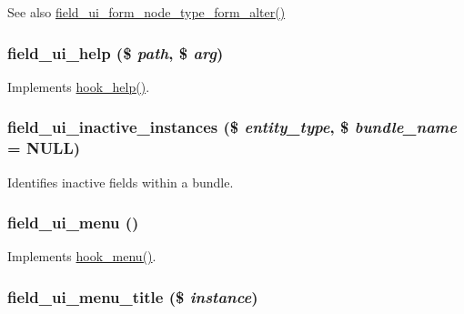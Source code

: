 \begin{DoxySeeAlso}{See also}
\hyperlink{field__ui_8module_ab23871fe4a263c0c11da6f5910525545}{field\_\-ui\_\-form\_\-node\_\-type\_\-form\_\-alter()} 
\end{DoxySeeAlso}
\hypertarget{field__ui_8module_a865661161ea523e51a55958d45bb9e9e}{
\subsubsection[{field\_\-ui\_\-help}]{\setlength{\rightskip}{0pt plus 5cm}field\_\-ui\_\-help (\$ {\em path}, \/  \$ {\em arg})}}
\label{field__ui_8module_a865661161ea523e51a55958d45bb9e9e}
Implements \hyperlink{group__hooks_ga5589c2714a782738e8851c4c90231f0e}{hook\_\-help()}. \hypertarget{field__ui_8module_a49d3221007d0ca39e179a931079716f1}{
\subsubsection[{field\_\-ui\_\-inactive\_\-instances}]{\setlength{\rightskip}{0pt plus 5cm}field\_\-ui\_\-inactive\_\-instances (\$ {\em entity\_\-type}, \/  \$ {\em bundle\_\-name} = {\ttfamily NULL})}}
\label{field__ui_8module_a49d3221007d0ca39e179a931079716f1}
Identifies inactive fields within a bundle. \hypertarget{field__ui_8module_a84565b21a33e9348e00755696dd26655}{
\subsubsection[{field\_\-ui\_\-menu}]{\setlength{\rightskip}{0pt plus 5cm}field\_\-ui\_\-menu ()}}
\label{field__ui_8module_a84565b21a33e9348e00755696dd26655}
Implements \hyperlink{group__hooks_ga5c95244fea59b25666e409759e133ded}{hook\_\-menu()}. \hypertarget{field__ui_8module_a6947266bcb38640f56ae1add799f40d6}{
\subsubsection[{field\_\-ui\_\-menu\_\-title}]{\setlength{\rightskip}{0pt plus 5cm}field\_\-ui\_\-menu\_\-title (\$ {\em instance})}}
